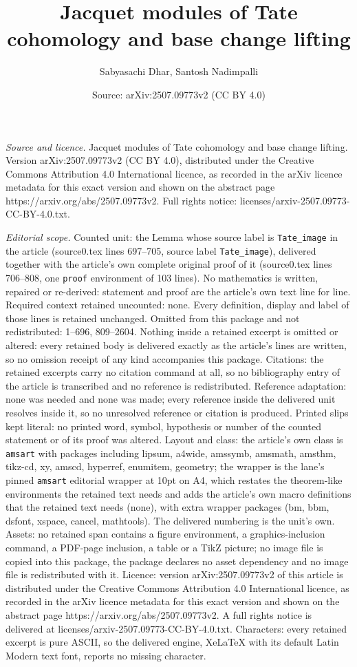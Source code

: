 \documentclass[10pt,a4paper]{amsart}
\title[Jacquet modules of Tate cohomology and base change lifting]{Jacquet modules of Tate cohomology and base change lifting}
\author{Sabyasachi Dhar, Santosh Nadimpalli}
\date{Source: arXiv:2507.09773v2 (CC BY 4.0)}
\begin{document}
\maketitle

\noindent\emph{Source and licence.} Jacquet modules of Tate cohomology and base change lifting. Version arXiv:2507.09773v2 (CC BY 4.0), distributed under the Creative Commons Attribution 4.0 International licence, as recorded in the arXiv licence metadata for this exact version and shown on the abstract page https://arxiv.org/abs/2507.09773v2. Full rights notice: licenses/arxiv-2507.09773-CC-BY-4.0.txt.\par\smallskip

\noindent\textit{Editorial scope.} Counted unit: the Lemma whose source label is \texttt{Tate\_image} in the article (source0.tex lines 697--705, source label \texttt{Tate\_image}), delivered together with the article's own complete original proof of it (source0.tex lines 706--808, one \texttt{proof} environment of 103 lines). No mathematics is written, repaired or re-derived: statement and proof are the article's own text line for line. Required context retained uncounted: none. Every definition, display and label of those lines is retained unchanged. Omitted from this package and not redistributed: 1--696, 809--2604. Nothing inside a retained excerpt is omitted or altered: every retained body is delivered exactly as the article's lines are written, so no omission receipt of any kind accompanies this package. Citations: the retained excerpts carry no citation command at all, so no bibliography entry of the article is transcribed and no reference is redistributed. Reference adaptation: none was needed and none was made; every reference inside the delivered unit resolves inside it, so no unresolved reference or citation is produced. Printed slips kept literal: no printed word, symbol, hypothesis or number of the counted statement or of its proof was altered. Layout and class: the article's own class is \texttt{amsart} with packages including lipsum, a4wide, amssymb, amsmath, amsthm, tikz-cd, xy, amscd, hyperref, enumitem, geometry; the wrapper is the lane's pinned \texttt{amsart} editorial wrapper at 10pt on A4, which restates the theorem-like environments the retained text needs and adds the article's own macro definitions that the retained text needs (none), with extra wrapper packages (bm, bbm, dsfont, xspace, cancel, mathtools). The delivered numbering is the unit's own. Assets: no retained span contains a figure environment, a graphics-inclusion command, a PDF-page inclusion, a table or a TikZ picture; no image file is copied into this package, the package declares no asset dependency and no image file is redistributed with it. Licence: version arXiv:2507.09773v2 of this article is distributed under the Creative Commons Attribution 4.0 International licence, as recorded in the arXiv licence metadata for this exact version and shown on the abstract page https://arxiv.org/abs/2507.09773v2. A full rights notice is delivered at licenses/arxiv-2507.09773-CC-BY-4.0.txt. Characters: every retained excerpt is pure ASCII, so the delivered engine, XeLaTeX with its default Latin Modern text font, reports no missing character.
\end{document}
